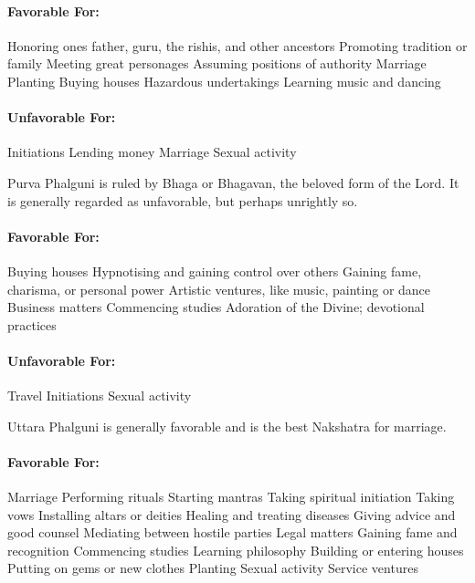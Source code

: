 

\paragraph{Favorable For:}

Honoring ones father, guru, the rishis, and other ancestors
Promoting tradition or family
Meeting great personages
Assuming positions of authority
Marriage
Planting
Buying houses
Hazardous undertakings
Learning music and dancing
 

\paragraph{Unfavorable For:}

Initiations
Lending money
Marriage
Sexual activity
 


Purva Phalguni is ruled by Bhaga or Bhagavan, the beloved form of the Lord. It is generally regarded as unfavorable, but perhaps unrightly so.

 

\paragraph{Favorable For:}

Buying houses
Hypnotising and gaining control over others
Gaining fame, charisma, or personal power
Artistic ventures, like music, painting or dance
Business matters
Commencing studies
Adoration of the Divine; devotional practices
 

\paragraph{Unfavorable For:}

Travel
Initiations
Sexual activity
 


Uttara Phalguni is generally favorable and is the best Nakshatra for marriage.

 

\paragraph{Favorable For:}

Marriage
Performing rituals
Starting mantras
Taking spiritual initiation
Taking vows
Installing altars or deities
Healing and treating diseases
Giving advice and good counsel
Mediating between hostile parties
Legal matters
Gaining fame and recognition
Commencing studies
Learning philosophy
Building or entering houses
Putting on gems or new clothes
Planting
Sexual activity
Service ventures
 


